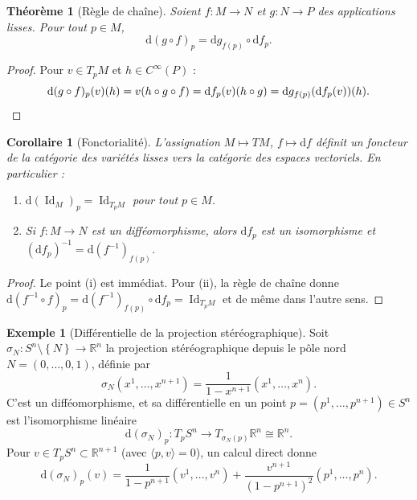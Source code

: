 \documentclass[12pt,a4paper,openany]{book}
\theoremstyle{definition}
\newtheorem{exemple}[definition]{Exemple}
\theoremstyle{plain}
\newtheorem{theoreme}[definition]{Théorème}
\newtheorem{corollaire}[definition]{Corollaire}
\theoremstyle{remark}
\newcommand{\R}{\mathbb{R}}
\DeclareMathOperator{\Id}{Id}
\newcommand{\dd}{\mathrm{d}}
\newcommand{\set}[1]{\left\{#1\right\}}
\begin{document}
\begin{theoreme}[Règle de chaîne]\label{thm:chaine}
Soient $f : M \to N$ et $g : N \to P$ des applications lisses. Pour tout $p \in M$,
\[
  \dd(g \circ f)_p = \dd g_{f(p)} \circ \dd f_p.
\]
\end{theoreme}

\begin{proof}
Pour $v \in T_pM$ et $h \in C^\infty(P)$ :
\[
  \dd(g \circ f)_p(v)(h) = v(h \circ g \circ f)
  = \dd f_p(v)(h \circ g)
  = \dd g_{f(p)}(\dd f_p(v))(h). \qedhere
\]
\end{proof}

\begin{corollaire}[Fonctorialité]\label{cor:fonctorialite}
L'assignation $M \mapsto TM$, $f \mapsto \dd f$ définit un foncteur
de la catégorie des variétés lisses vers la catégorie des espaces vectoriels.
En particulier :
\begin{enumerate}[label=(\roman*)]
  \item $\dd(\Id_M)_p = \Id_{T_pM}$ pour tout $p \in M$.
  \item Si $f : M \to N$ est un difféomorphisme, alors
    $\dd f_p$ est un isomorphisme et $(\dd f_p)^{-1} = \dd(f^{-1})_{f(p)}$.
\end{enumerate}
\end{corollaire}

\begin{proof}
Le point (i) est immédiat. Pour (ii), la règle de chaîne donne
$\dd(f^{-1} \circ f)_p = \dd(f^{-1})_{f(p)} \circ \dd f_p = \Id_{T_pM}$
et de même dans l'autre sens.
\end{proof}

\begin{exemple}[Différentielle de la projection stéréographique]\label{ex:diff-stereo}
Soit $\sigma_N : S^n \setminus \set{N} \to \R^n$ la projection stéréographique depuis
le pôle nord $N = (0, \ldots, 0, 1)$, définie par
\[
  \sigma_N(x^1, \ldots, x^{n+1}) = \frac{1}{1 - x^{n+1}}(x^1, \ldots, x^n).
\]
C'est un difféomorphisme, et sa différentielle en un point $p = (p^1, \ldots, p^{n+1}) \in S^n$
est l'isomorphisme linéaire
\[
  \dd(\sigma_N)_p : T_pS^n \longrightarrow T_{\sigma_N(p)}\R^n \cong \R^n.
\]
Pour $v \in T_pS^n \subset \R^{n+1}$ (avec $\langle p, v \rangle = 0$), un calcul
direct donne
\[
  \dd(\sigma_N)_p(v) = \frac{1}{1 - p^{n+1}}\left(v^1, \ldots, v^n\right)
  + \frac{v^{n+1}}{(1 - p^{n+1})^2}\left(p^1, \ldots, p^n\right).
\]
\end{exemple}
\end{document}
